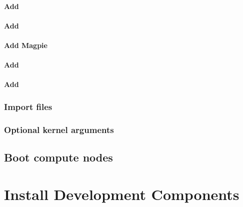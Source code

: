 \documentclass{ohpc-doc}
\begin{document}
\subsubsection{Add \clustershell{}}


\subsubsection{Add \genders{}}


\subsubsection{Add Magpie}


\subsubsection{Add \conman{}} \label{sec:add_conman}


\subsubsection{Add \nhc{}} \label{sec:add_nhc}



\subsection{Import files} \label{sec:file_import}








\subsection{Optional kernel arguments} \label{sec:optional_kargs}



\section{Boot compute nodes} \label{sec:boot_computes}


\chapter{Install \OHPC{} Development Components}

\end{document}
